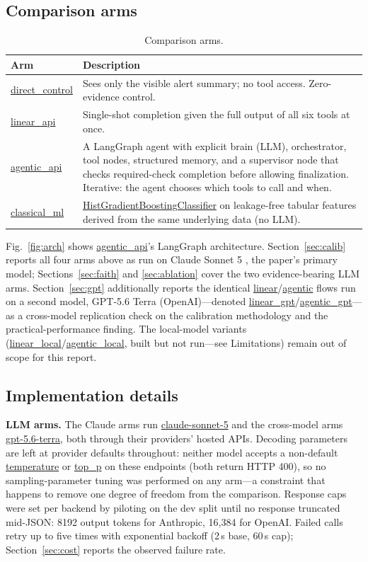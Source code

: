 \documentclass[]{ieeeaccess}
\newcommand{\code}[1]{\url{#1}}
\begin{document}
\subsection{Comparison arms}\label{sec:arms}

\begin{table}[H]
\centering
\caption{Comparison arms.}\label{tab:arms}
\footnotesize
\begin{tabularx}{\columnwidth}{@{}lX@{}}
\toprule
\textbf{Arm} & \textbf{Description} \\
\midrule
\code{direct_control} & Sees only the visible alert summary; no tool
access. Zero-evidence control. \\
\code{linear_api} & Single-shot completion given the full output of all
six tools at once. \\
\code{agentic_api} & A LangGraph agent with explicit brain (LLM),
orchestrator, tool nodes, structured memory, and a supervisor node that
checks required-check completion before allowing finalization.
Iterative: the agent chooses which tools to call and when. \\
\code{classical_ml} & \code{HistGradientBoostingClassifier} on
leakage-free tabular features derived from the same underlying data (no
LLM). \\
\bottomrule
\end{tabularx}
\end{table}

Fig.~\ref{fig:arch} shows \code{agentic_api}'s LangGraph architecture.
Section~\ref{sec:calib} reports all four arms above as run on Claude
Sonnet 5 \cite{claude2026}, the paper's primary model;
Sections~\ref{sec:faith} and \ref{sec:ablation} cover the two
evidence-bearing LLM arms. Section~\ref{sec:gpt} additionally reports the identical
\code{linear}/\code{agentic} flows run on a second model, GPT-5.6 Terra
(OpenAI)---denoted \code{linear_gpt}/\code{agentic_gpt}---as a
cross-model replication check on the calibration methodology and the
practical-performance finding. The local-model variants
(\code{linear_local}/\code{agentic_local}, built but not run---see
Limitations) remain out of scope for this report.

\subsection{Implementation details}\label{sec:impl}

\textbf{LLM arms.} The Claude arms run \code{claude-sonnet-5} and the
cross-model arms \code{gpt-5.6-terra}, both through their providers'
hosted APIs. Decoding parameters are left at provider defaults
throughout: neither model accepts a non-default \code{temperature} or
\code{top_p} on these endpoints (both return HTTP 400), so no
sampling-parameter tuning was performed on any arm---a constraint that
happens to remove one degree of freedom from the comparison. Response
caps were set per backend by piloting on the dev split until no
response truncated mid-JSON: 8192 output tokens for Anthropic, 16{,}384
for OpenAI. Failed calls retry up to five times with exponential
backoff (2\,s base, 60\,s cap); Section~\ref{sec:cost} reports the
observed failure rate.
\end{document}
